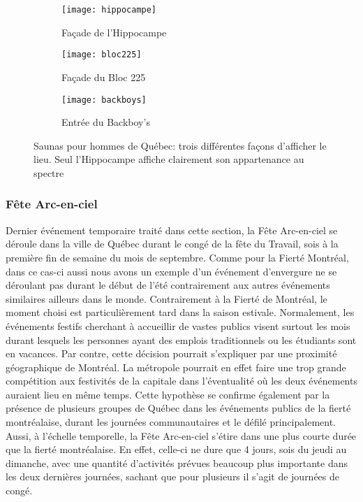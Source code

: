 \begin{figure}
\centering
\begin{subfigure}[b]{.45\linewidth}
\texttt{[image: hippocampe]}
\caption{Façade de l'Hippocampe\label{fig:hippocampe}}
\end{subfigure}

\begin{subfigure}[b]{.45\linewidth}
\texttt{[image: bloc225]}
\caption{Façade du Bloc 225\label{fig:bloc225}}
\end{subfigure}
\begin{subfigure}[b]{.45\linewidth}
\texttt{[image: backboys]}
\caption{Entrée du Backboy's\label{fig:backboys}}
\end{subfigure}
\caption[Saunas pour hommes de Québec]{Saunas pour hommes de Québec: trois différentes façons d'afficher le lieu. Seul l'Hippocampe affiche clairement son appartenance au spectre \lgbt{}}\label{figs:saunas}
\end{figure}

\subsubsection{Fête Arc-en-ciel}
\label{subsec:fetearcenciel}
Dernier événement temporaire traité dans cette section, la Fête Arc-en-ciel se déroule dans la ville de Québec durant le congé de la fête du Travail, sois à la première fin de semaine du mois de septembre.
Comme pour la Fierté Montréal, dans ce cas-ci aussi nous avons un exemple d'un événement d'envergure ne se déroulant pas durant le début de l'été contrairement aux autres événements similaires ailleurs dans le monde.
Contrairement à la Fierté de Montréal, le moment choisi est particulièrement tard dans la saison estivale.
Normalement, les événements festifs cherchant à accueillir de vastes publics visent surtout les mois durant lesquels les personnes ayant des emplois traditionnels ou les étudiants sont en vacances.
Par contre, cette décision pourrait s'expliquer par une proximité géographique de Montréal.
La métropole pourrait en effet faire une trop grande compétition aux festivités de la capitale dans l'éventualité où les deux événements auraient lieu en même temps.
Cette hypothèse se confirme également par la présence de plusieurs groupes de Québec dans les événements publics de la fierté montréalaise, durant les journées communautaires et le défilé principalement.
Aussi, à l'échelle temporelle, la Fête Arc-en-ciel s'étire dans une plus courte durée que la fierté montréalaise.
En effet, celle-ci ne dure que 4 jours, sois du jeudi au dimanche, avec une quantité d'activités prévues beaucoup plus importante dans les deux dernières journées, sachant que pour plusieurs il s'agit de journées de congé.

